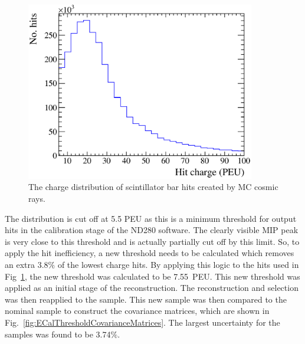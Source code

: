 \begin{figure}[b!]
  \centering
  \includegraphics[width=10cm]{images/measurement/systematics/detector/threshold/hit_charge_cosmic_MC_PEU.eps}
  \caption{The charge distribution of scintillator bar hits created by MC cosmic rays.}
  \label{fig:HitChargeCosmicMCPEU}
\end{figure}
The distribution is cut off at 5.5 PEU as this is a minimum threshold for output hits in the calibration stage of the ND280 software.  The clearly visible MIP peak is very close to this threshold and is actually partially cut off by this limit.  So, to apply the hit inefficiency, a new threshold needs to be calculated which removes an extra 3.8$\%$ of the lowest charge hits.  By applying this logic to the hits used in Fig~\ref{fig:HitChargeCosmicMCPEU}, the new threshold was calculated to be 7.55~PEU.  This new threshold was applied as an initial stage of the reconstruction.  The reconstruction and selection was then reapplied to the sample.  This new sample was then compared to the nominal sample to construct the covariance matrices, which are shown in Fig.~\ref{fig:ECalThresholdCovarianceMatrices}.  The largest uncertainty for the samples was found to be 3.74$\%$.
